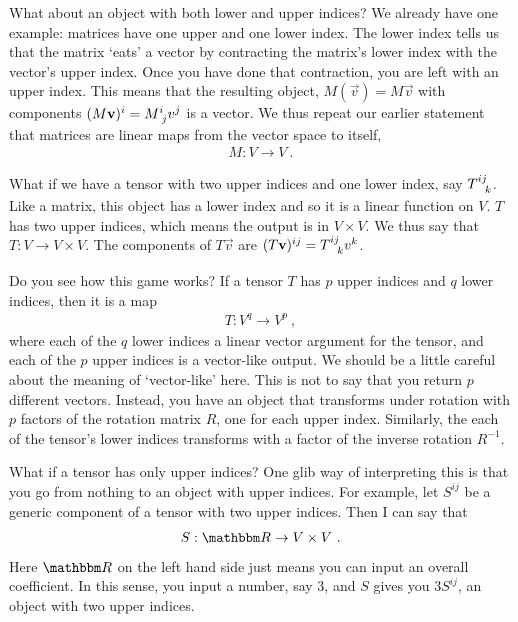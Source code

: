 \documentclass[12pt]{article}
\begin{document}
What about an object with both lower and upper indices? We already have one example: matrices have one upper and one lower index. The lower index tells us that the matrix `eats' a vector by contracting the matrix's lower index with the vector's upper index. Once you have done that contraction, you are left with an upper index. This means that the resulting object, $M(\vec{v}) = M\vec{v}$ with components $(M\vec{v})^i = M\aij{i}{j}v^j$ is a vector. We thus repeat our earlier statement that matrices are linear maps from the vector space to itself,
\begin{align}
    M: V\to V \ .
\end{align}


What if we have a tensor with two upper indices and one lower index, say $T\aij{ij}{k}$. Like a matrix, this object has a lower index and so it is a linear function on $V$. $T$ has two upper indices, which means the output is in $V\times V$. We thus say that $T: V\to V\times V$. The components of $T\vec{v}$ are $(T\vec{v})^{ij} = T\aij{ij}{k}v^k$.

Do you see how this game works? If a tensor $T$ has $p$ upper indices and $q$ lower indices, then it is a map
\begin{align}
    T: V^q \to V^p \ ,
\end{align}
where each of the $q$ lower indices a linear vector argument for the tensor, and each of the $p$ upper indices is a vector-like output. We should be a little careful about the meaning of `vector-like' here. This is not to say that you return $p$ different vectors. Instead, you have an object that transforms under rotation with $p$ factors of the rotation matrix $R$, one for each upper index. Similarly, the each of the tensor's lower indices transforms with a factor of the inverse rotation $R^{-1}$. 

What if a tensor has only upper indices? One glib way of interpreting this is that you go from nothing to an object with upper indices. For example, let $S^{ij}$ be a generic component of a tensor with two upper indices. Then I can say that
\begin{align}
    S: \RR \to V\times V \ . \label{eq:S:two:upper:O:to:VV}
\end{align}
Here $\RR$ on the left hand side just means you can input an overall coefficient. In this sense, you input a number, say $3$, and $S$ gives you $3S^{ij}$, an object with two upper indices.
\end{document}
